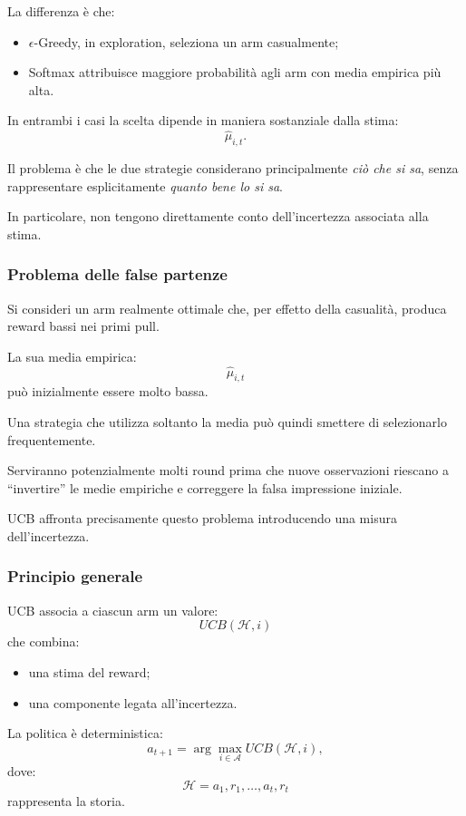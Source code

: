 La differenza è che:
\begin{itemize}
    \item $\epsilon$-Greedy, in exploration, seleziona un arm casualmente;
    \item Softmax attribuisce maggiore probabilità agli arm con media empirica più alta.
\end{itemize}

In entrambi i casi la scelta dipende in maniera sostanziale dalla stima:
\[
\widehat{\mu}_{i,t}.
\]

Il problema è che le due strategie considerano principalmente \emph{ciò che si sa}, senza rappresentare esplicitamente \emph{quanto bene lo si sa}.

In particolare, non tengono direttamente conto dell'incertezza associata alla stima.

\subsubsection{Problema delle false partenze}

Si consideri un arm realmente ottimale che, per effetto della casualità, produca reward bassi nei primi pull.

La sua media empirica:
\[
\widehat{\mu}_{i,t}
\]
può inizialmente essere molto bassa.

Una strategia che utilizza soltanto la media può quindi smettere di selezionarlo frequentemente.

Serviranno potenzialmente molti round prima che nuove osservazioni riescano a ``invertire'' le medie empiriche e correggere la falsa impressione iniziale.

UCB affronta precisamente questo problema introducendo una misura dell'incertezza.

\subsubsection{Principio generale}

UCB associa a ciascun arm un valore:
\[
UCB(\mathcal{H},i)
\]
che combina:
\begin{itemize}
    \item una stima del reward;
    \item una componente legata all'incertezza.
\end{itemize}

La politica è deterministica:
\[
a_{t+1}
=
\arg\max_{i\in\mathcal{A}}
UCB(\mathcal{H},i),
\]
dove:
\[
\mathcal{H}
=
a_1,r_1,\ldots,a_t,r_t
\]
rappresenta la storia.

